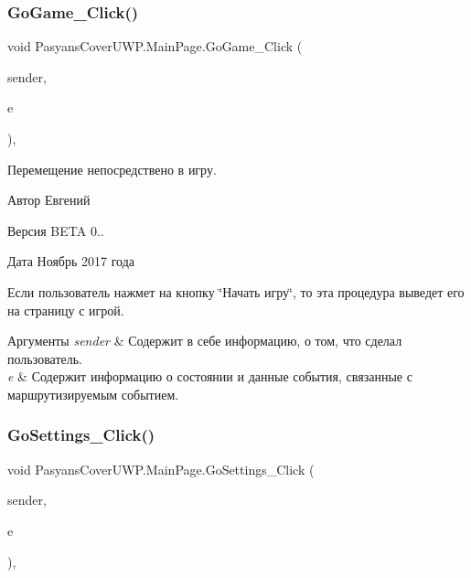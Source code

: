 \subsubsection{\texorpdfstring{Go\+Game\+\_\+\+Click()}{GoGame\_Click()}}
{\footnotesize\ttfamily void Pasyans\+Cover\+U\+W\+P.\+Main\+Page.\+Go\+Game\+\_\+\+Click (\begin{DoxyParamCaption}\item[{object}]{sender,  }\item[{Routed\+Event\+Args}]{e }\end{DoxyParamCaption})\hspace{0.3cm}{\ttfamily [inline]}, {\ttfamily [private]}}



Перемещение непосредствено в игру. 

\begin{DoxyAuthor}{Автор}
Евгений 
\end{DoxyAuthor}
\begin{DoxyVersion}{Версия}
B\+E\+TA 0.. 
\end{DoxyVersion}
\begin{DoxyDate}{Дата}
Ноябрь 2017 года
\end{DoxyDate}
Если пользователь нажмет на кнопку \char`\"{}Начать игру\char`\"{}, то эта процедура выведет его на страницу с игрой. 
\begin{DoxyParams}{Аргументы}
{\em sender} & Содержит в себе информацию, о том, что сделал пользователь. \\
\hline
{\em e} & Содержит информацию о состоянии и данные события, связанные с маршрутизируемым событием. \\
\hline
\end{DoxyParams}
\mbox{\label{class_pasyans_cover_u_w_p_1_1_main_page_abe216ee6080b3df3e003061c143e9a39}} 
\subsubsection{\texorpdfstring{Go\+Settings\+\_\+\+Click()}{GoSettings\_Click()}}
{\footnotesize\ttfamily void Pasyans\+Cover\+U\+W\+P.\+Main\+Page.\+Go\+Settings\+\_\+\+Click (\begin{DoxyParamCaption}\item[{object}]{sender,  }\item[{Routed\+Event\+Args}]{e }\end{DoxyParamCaption})\hspace{0.3cm}{\ttfamily [inline]}, {\ttfamily [private]}}



